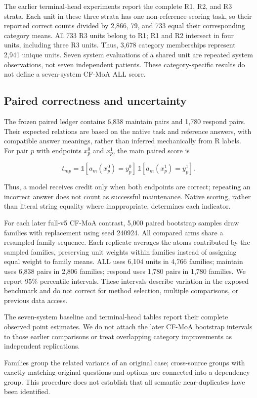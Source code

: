 The earlier terminal-head experiments report the complete R1, R2, and R3 strata. Each
unit in these three strata has one non-reference scoring task, so their reported correct
counts divided by 2,866, 79, and 733 equal their corresponding category means. All 733 R3
units belong to R1; R1 and R2 intersect in four units, including three R3 units. Thus,
3,678 category memberships represent 2,941 unique units. Seven system evaluations of a
shared unit are repeated system observations, not seven independent patients. These
category-specific results do not define a seven-system CF-MoA ALL score.

\subsection{Paired correctness and uncertainty}
\label{sec:task_contract-paired-correctness-and-uncertainty}

The frozen paired ledger contains 6,838 maintain pairs and 1,780 respond pairs. Their
expected relations are based on the native task and reference answers, with compatible
answer meanings, rather than inferred mechanically from R labels. For pair \(p\) with
endpoints \(x_p^0\) and \(x_p^1\), the main paired score is

\begin{equation}
\label{eq:paired_score}
t_{mp}=\mathbb{1}[a_m(x_p^0)=y_p^0]\,
       \mathbb{1}[a_m(x_p^1)=y_p^1].
\end{equation}

Thus, a model receives credit only when both endpoints are correct; repeating an incorrect
answer does not count as successful maintenance. Native scoring, rather than literal
string equality where inappropriate, determines each indicator.

For each later full-v5 CF-MoA contrast, 5,000 paired bootstrap samples draw families with replacement using
seed 240924. All compared arms share a resampled family sequence. Each replicate averages
the atoms contributed by the sampled families, preserving unit weights within families
instead of assigning equal weight to family means. ALL uses 6,104 units in 4,766 families;
maintain uses 6,838 pairs in 2,806 families; respond uses 1,780 pairs in 1,780 families.
We report 95\% percentile intervals. These intervals describe variation in the exposed
benchmark and do not correct for method selection, multiple comparisons, or previous data
access.

The seven-system baseline and terminal-head tables report their complete observed point
estimates. We do not attach the later CF-MoA bootstrap intervals to those earlier
comparisons or treat overlapping category improvements as independent replications.

Families group the related variants of an original case; cross-source groups with exactly
matching original questions and options are connected into a dependency group. This
procedure does not establish that all semantic near-duplicates have been identified.
